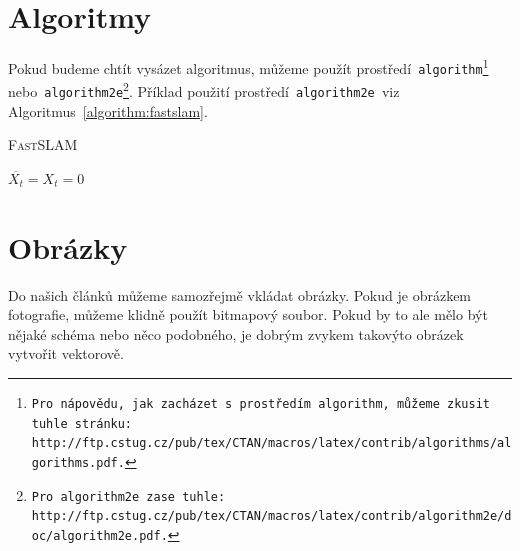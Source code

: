 \documentclass[11pt,a4paper]{article}
\begin{document}
\section{Algoritmy}
\label{section:algoritmy}
Pokud budeme chtít vysázet algoritmus, můžeme použít prostředí\texttt{ algorithm\footnote{Pro nápovědu, jak zacházet s~prostředím\texttt{ algorithm,} můžeme zkusit tuhle stránku: \\http://ftp.cstug.cz/pub/tex/CTAN/macros/latex/contrib/algorithms/algorithms.pdf.}}
nebo\texttt{ algorithm2e\footnote{Pro\texttt{ algorithm2e }zase tuhle: http://ftp.cstug.cz/pub/tex/CTAN/macros/latex/contrib/algorithm2e/doc/algorithm2e.pdf.}}. 
Příklad použití prostředí\texttt{ algorithm2e }viz Algoritmus~\ref{algorithm:fastslam}. \\
	\IncMargin{1.5em}
	\begin{algorithm}
		\caption{\textsc{FastSLAM}}
		\label{algorithm:fastslam}

		\SetNlSty{}{}{:}
		\SetNlSkip{0.4em}
		\SetInd{1em}{1em}

		\Indm\Indmm
		\Indp\Indpp
		\BlankLine

		$ \overline{X_t} = X_t = 0 $ \\



	\end{algorithm}
	\DecMargin{1.5em}
	
\section{Obrázky}
Do našich článků můžeme samozřejmě vkládat obrázky. Pokud je obrázkem fotografie,
můžeme klidně použít bitmapový soubor. Pokud by to ale mělo být nějaké schéma nebo
něco podobného, je dobrým zvykem takovýto obrázek vytvořit vektorově.
\end{document}
